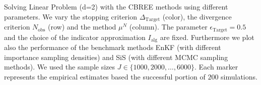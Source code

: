 Solving Linear Problem (d=2) with the CBREE methods using      different parameters.     We vary the stopping criterion $\Delta_{\text{Target}}$ (color),     the divergence criterion $N_\text{obs}$ (row) and     the method $\mu^N$ (column).     The parameter $\epsilon_{\text{Target}} = 0.5$     and the choice of the indicator approximation $I_\text{alg}$     are fixed.     Furthermore we plot also the performance of the benchmark methods EnKF    (with different importance sampling densities)    and SiS (with different MCMC sampling methods).     We used the sample sizes $J \in \{1000, 2000, \ldots, 6000\}$.     Each marker represents the empirical estimates based the successful portion of $200$ simulations.
